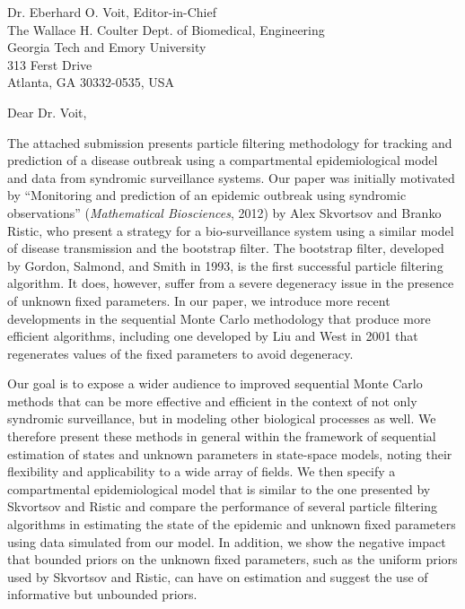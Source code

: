 \documentclass[ucsb,pstat,12pt]{ucletter}
\begin{document}
\signature{Daniel M. Sheinson, Jarad Niemi, and Wendy Meiring}           %
\longindentation=0pt                       %
\let\raggedleft\raggedright                %

\begin{letter}{Dr. Eberhard O. Voit, Editor-in-Chief \\
The Wallace H. Coulter Dept. of Biomedical, Engineering \\
Georgia Tech and Emory University \\
313 Ferst Drive \\
Atlanta, GA 30332-0535, USA
}

\opening{Dear Dr. Voit,}

\noindent The attached submission presents particle filtering methodology for tracking and prediction of a disease outbreak using a compartmental epidemiological model and data from syndromic surveillance systems. Our paper was initially motivated by ``Monitoring and prediction of an epidemic outbreak using syndromic observations'' (\emph{Mathematical Biosciences}, 2012) by Alex Skvortsov and Branko Ristic, who present a strategy for a bio-surveillance system using a similar model of disease transmission and the bootstrap filter. The bootstrap filter, developed by Gordon, Salmond, and Smith in 1993, is the first successful particle filtering algorithm. It does, however, suffer from a severe degeneracy issue in the presence of unknown fixed parameters. In our paper, we introduce more recent developments in the sequential Monte Carlo methodology that produce more efficient algorithms, including one developed by Liu and West in 2001 that regenerates values of the fixed parameters to avoid degeneracy.

Our goal is to expose a wider audience to improved sequential Monte Carlo methods that can be more effective and efficient in the context of not only syndromic surveillance, but in modeling other biological processes as well. We therefore present these methods in general within the framework of sequential estimation of states and unknown parameters in state-space models, noting their flexibility and applicability to a wide array of fields. We then specify a compartmental epidemiological model that is similar to the one presented by Skvortsov and Ristic and compare the performance of several particle filtering algorithms in estimating the state of the epidemic and unknown fixed parameters using data simulated from our model. In addition, we show the negative impact that bounded priors on the unknown fixed parameters, such as the uniform priors used by Skvortsov and Ristic, can have on estimation and suggest the use of informative but unbounded priors.


\end{letter}
\end{document}
